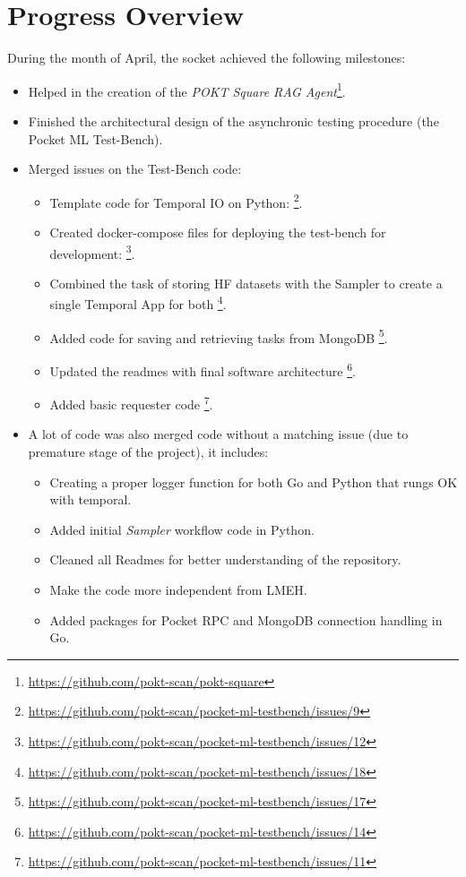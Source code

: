 \section{Progress Overview}\label{sec:a}

During the month of April, the socket achieved the following milestones:

\begin{itemize}
    \item Helped in the creation of the \emph{POKT Square RAG Agent}\footnote{\url{https://github.com/pokt-scan/pokt-square}}.
    \item Finished the architectural design of the asynchronic testing procedure (the Pocket \gls{ML} Test-Bench).
    \item Merged issues on the Test-Bench code:
    \begin{itemize}
        \item Template code for Temporal IO on Python: \footnote{\url{https://github.com/pokt-scan/pocket-ml-testbench/issues/9}}.
        \item Created docker-compose files for deploying the test-bench for development: \footnote{\url{https://github.com/pokt-scan/pocket-ml-testbench/issues/12}}.
        \item Combined the task of storing \gls{HF} datasets with the Sampler to create a single Temporal App for both \footnote{\url{https://github.com/pokt-scan/pocket-ml-testbench/issues/18}}.
        \item Added code for saving and retrieving tasks from MongoDB \footnote{\url{https://github.com/pokt-scan/pocket-ml-testbench/issues/17}}.
        \item Updated the readmes with final software architecture \footnote{\url{https://github.com/pokt-scan/pocket-ml-testbench/issues/14}}.
        \item Added basic requester code \footnote{\url{https://github.com/pokt-scan/pocket-ml-testbench/issues/11}}.
    \end{itemize}
    \item A lot of code was also merged code without a matching issue (due to premature stage of the project), it includes:
    \begin{itemize}
        \item Creating a proper logger function for both Go and Python that rungs OK with temporal.
        \item Added initial \emph{Sampler} workflow code in Python.
        \item Cleaned all Readmes for better understanding of the repository.
        \item Make the code more independent from \gls{LMEH}.
        \item Added packages for Pocket RPC and MongoDB connection handling in Go.
    \end{itemize}
\end{itemize}
